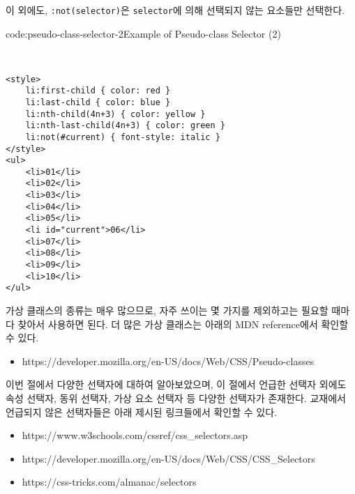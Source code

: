 이 외에도, \texttt{:not(selector)}은 \texttt{selector}에 의해 선택되지 않는 요소들만 선택한다.

\begin{codeenv}{code:pseudo-class-selector-2}{Example of Pseudo-class Selector (2)}\begin{verbatim}


<style>
    li:first-child { color: red }
    li:last-child { color: blue }
    li:nth-child(4n+3) { color: yellow }
    li:nth-last-child(4n+3) { color: green }
    li:not(#current) { font-style: italic }
</style>
<ul>
    <li>01</li>
    <li>02</li>
    <li>03</li>
    <li>04</li>
    <li>05</li>
    <li id="current">06</li>
    <li>07</li>
    <li>08</li>
    <li>09</li>
    <li>10</li>
</ul>
\end{verbatim}
\end{codeenv}

가상 클래스의 종류는 매우 많으므로, 자주 쓰이는 몇 가지를 제외하고는 필요할 때마다 찾아서 사용하면 된다. 더 많은 가상 클래스는 아래의 MDN reference에서 확인할 수 있다. 

\begin{itemize}
    \item https://developer.mozilla.org/en-US/docs/Web/CSS/Pseudo-classes
\end{itemize}

이번 절에서 다양한 선택자에 대하여 알아보았으며, 이 절에서 언급한 선택자 외에도 속성 선택자, 동위 선택자, 가상 요소 선택자 등 다양한 선택자가 존재한다. 교재에서 언급되지 않은 선택자들은 아래 제시된 링크들에서 확인할 수 있다.

\begin{itemize}
    \item https://www.w3schools.com/cssref/css\_selectors.asp
    \item https://developer.mozilla.org/en-US/docs/Web/CSS/CSS\_Selectors
    \item https://css-tricks.com/almanac/selectors
\end{itemize}
